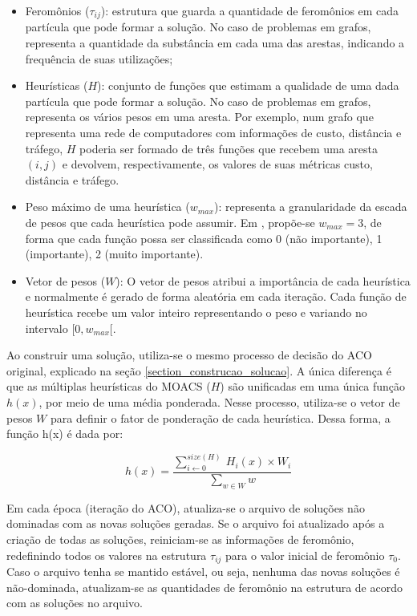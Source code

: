 \begin{itemize}  
	\item Feromônios ($\tau_{ij}$): estrutura que guarda a quantidade de feromônios em cada partícula que pode formar a solução. No caso de problemas em grafos, representa a quantidade da substância em cada uma das arestas, indicando a frequência de suas utilizações;
	\item Heurísticas ($H$): conjunto de funções que estimam a qualidade de uma dada partícula que pode formar a solução. No caso de problemas em grafos, representa os vários pesos em uma aresta. Por exemplo, num grafo que representa uma rede de computadores com informações de custo, distância e tráfego, $H$ poderia ser formado de três funções que recebem uma aresta $(i,j)$ e devolvem, respectivamente, os valores de suas métricas custo, distância e tráfego.
	\item Peso máximo de uma heurística ($w_{max}$): representa a granularidade da escada de pesos que cada heurística pode assumir. Em \cite{Riveros2016}, propõe-se $w_{max} = 3$, de forma que cada função possa ser classificada como 0 (não importante), 1 (importante), 2 (muito importante).
	\item Vetor de pesos ($W$): O vetor de pesos atribui a importância de cada heurística e normalmente é gerado de forma aleatória em cada iteração. Cada função de heurística recebe um valor inteiro representando o peso e variando no intervalo $[0, w_{max}[$.
\end{itemize}

Ao construir uma solução, utiliza-se o mesmo processo de decisão do ACO original, explicado na seção \ref{section_construcao_solucao}. A única diferença é que as múltiplas heurísticas do MOACS ($H$) são unificadas em uma única função $h(x)$, por meio de uma média ponderada. Nesse processo, utiliza-se o vetor de pesos $W$ para definir o fator de ponderação de cada heurística. Dessa forma, a função h(x) é dada por:

\begin{equation}h(x) = \frac{\sum_{i \gets 0}^{size(H)}\ H_i(x) \times W_i}{\sum_{w \in W} w}\end{equation}

Em cada época (iteração do ACO), atualiza-se o arquivo de soluções não dominadas com as novas soluções geradas. Se o arquivo foi atualizado após a criação de todas as soluções, reiniciam-se as informações de feromônio, redefinindo todos os valores na estrutura $\tau_{ij}$ para o valor inicial de feromônio $\tau_0$. Caso o arquivo tenha se mantido estável, ou seja, nenhuma das novas soluções é não-dominada, atualizam-se as quantidades de feromônio na estrutura de acordo com as soluções no arquivo.

